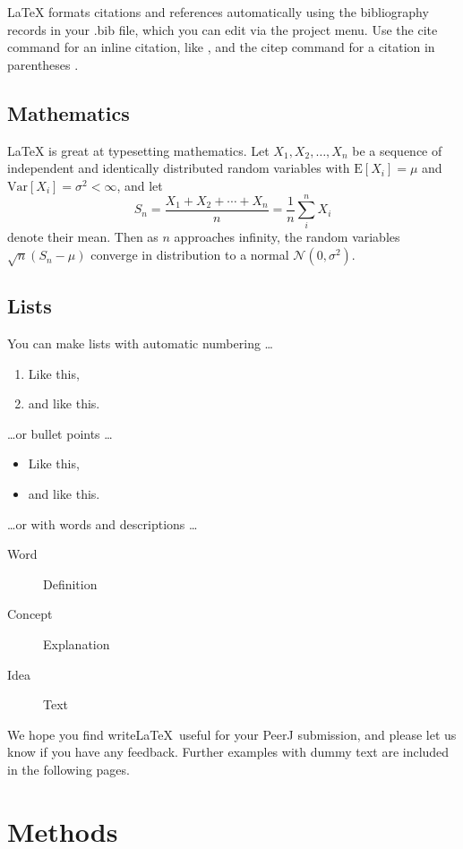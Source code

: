 \documentclass[fleqn,10pt,lineno]{wlpeerj} %
\begin{document}
LaTeX formats citations and references automatically using the bibliography records in your .bib file, which you can edit via the project menu. Use the cite command for an inline citation, like \cite{Figueredo:2009dg}, and the citep command for a citation in parentheses \citep{Figueredo:2009dg}.

\subsection*{Mathematics}

\LaTeX{} is great at typesetting mathematics. Let $X_1, X_2, \ldots, X_n$ be a sequence of independent and identically distributed random variables with $\text{E}[X_i] = \mu$ and $\text{Var}[X_i] = \sigma^2 < \infty$, and let
$$S_n = \frac{X_1 + X_2 + \cdots + X_n}{n}
      = \frac{1}{n}\sum_{i}^{n} X_i$$
denote their mean. Then as $n$ approaches infinity, the random variables $\sqrt{n}(S_n - \mu)$ converge in distribution to a normal $\mathcal{N}(0, \sigma^2)$.

\subsection*{Lists}

You can make lists with automatic numbering \dots

\begin{enumerate}[noitemsep]
\item Like this,
\item and like this.
\end{enumerate}
\dots or bullet points \dots
\begin{itemize}[noitemsep]
\item Like this,
\item and like this.
\end{itemize}
\dots or with words and descriptions \dots
\begin{description}
\item[Word] Definition
\item[Concept] Explanation
\item[Idea] Text
\end{description}

We hope you find write\LaTeX\ useful for your PeerJ submission, and please let us know if you have any feedback. Further examples with dummy text are included in the following pages.

\section*{Methods}
\end{document}
